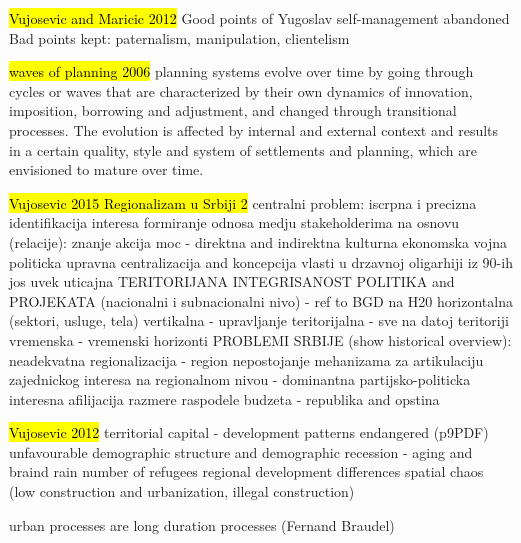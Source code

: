 \documentclass[11pt]{report}
\begin{document}
\hl{Vujosevic and Maricic 2012}
Good points of Yugoslav self-management abandoned
Bad points kept: paternalism, manipulation, clientelism

 	\hl{waves of planning 2006}
planning systems evolve over time by going through cycles or waves that are characterized  by  their  own  dynamics  of  innovation,  imposition,  borrowing  and  adjustment,  and changed through transitional processes. The evolution is affected by internal and external context and results in a certain quality, style and system of settlements and planning, which
are envisioned to mature over time.

\hl{Vujosevic 2015 Regionalizam u Srbiji 2}
centralni problem: iscrpna i precizna identifikacija interesa
formiranje odnosa medju stakeholderima na osnovu (relacije):
    znanje
    akcija
    moc - direktna and indirektna
        kulturna
        ekonomska
        vojna
        politicka
upravna centralizacija and koncepcija vlasti u drzavnoj oligarhiji iz 90-ih jos uvek uticajna
TERITORIJANA INTEGRISANOST POLITIKA and PROJEKATA (nacionalni i subnacionalni nivo) - ref to BGD na H20
    horizontalna (sektori, usluge, tela)
    vertikalna - upravljanje
    teritorijalna - sve na datoj teritoriji
    vremenska - vremenski horizonti
PROBLEMI SRBIJE (show historical overview):
    neadekvatna regionalizacija  - region
    nepostojanje mehanizama za artikulaciju zajednickog interesa na regionalnom nivou - dominantna partijsko-politicka interesna afilijacija
    razmere raspodele budzeta - republika and opstina

\hl{Vujosevic 2012}
territorial capital - development patterns endangered  (p9PDF)
    unfavourable demographic structure and demographic recession - aging and braind rain
    number of refugees
    regional development differences
    spatial chaos (low construction and urbanization, illegal construction)
    
urban processes are long duration processes (Fernand Braudel)
\end{document}
